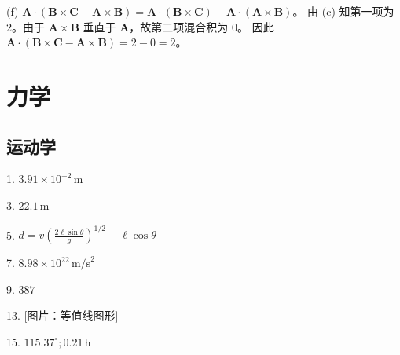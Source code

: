 \begin{solution}
(f) $\boldsymbol{A} \cdot (\boldsymbol{B} \times \boldsymbol{C} - \boldsymbol{A} \times \boldsymbol{B}) = \boldsymbol{A} \cdot (\boldsymbol{B} \times \boldsymbol{C}) - \boldsymbol{A} \cdot (\boldsymbol{A} \times \boldsymbol{B})$。
由 (c) 知第一项为 $2$。由于 $\boldsymbol{A} \times \boldsymbol{B}$ 垂直于 $\boldsymbol{A}$，故第二项混合积为 $0$。
因此 $\boldsymbol{A} \cdot (\boldsymbol{B} \times \boldsymbol{C} - \boldsymbol{A} \times \boldsymbol{B}) = 2 - 0 = 2$。
\end{solution}



\part{力学}

\chapter{运动学}

\begin{oddanswers}
1. $3.91 \times 10^{-2}\,\mathrm{m}$

3. $22.1\,\mathrm{m}$

5. $d = v\left(\frac{2\ell \sin\theta}{g}\right)^{1/2} - \ell \cos\theta$

7. $8.98 \times 10^{22}\,\mathrm{m/s}^2$

9. $387$

13. [图片：等值线图形]

15. $115.37^\circ; 0.21\,\mathrm{h}$
\end{oddanswers}

